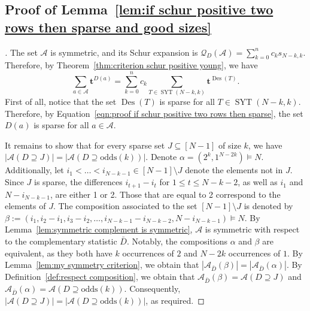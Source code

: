 \documentclass[11pt]{article}
\theoremstyle{definition}
\numberwithin{equation}{section}
\providecommand{\nopunct}{\spacefactor1007\relax}
\newcommand{\Des}{\operatorname{Des}}
\newcommand{\Syt}{\operatorname{SYT}}
\newcommand{\Q}{\mathcal{Q}}
\newcommand{\A}{\mathcal{A}}
\newcommand{\odds}{\mathrm{odds}}
\begin{document}
\subsection{Proof of Lemma~\ref{lem:if schur positive two rows then sparse and good sizes}}
\label{subsec:proof lemma if schur positive two rows then sparse and good sizes}
\begin{proof}[\unskip\nopunct]
    The set $\A$ is symmetric, and its Schur expansion is $\Q_{D}(\A) = \sum_{k=0}^n c_k s_{N-k,k}$. Therefore, by Theorem~\ref{thm:criterion schur positive young}, we have
    \begin{equation}\label{eqn:proof if schur positive two rows then sparse}
        \sum_{a \in \A} \boldsymbol{t}^{D(a)} = \sum_{k=0}^n c_k \sum_{T \in \Syt(N-k,k)} \boldsymbol{t}^{\Des(T)}.
    \end{equation}
    First of all, notice that the set $\Des(T)$ is sparse for all $T \in \Syt(N-k,k)$. Therefore, by Equation~\eqref{eqn:proof if schur positive two rows then sparse}, the set $D(a)$ is sparse for all $a \in \A$.
    
    It remains to show that for every sparse set $J \subseteq [N-1]$ of size $k$, we have $\left|\A(D \supseteq J)\right| = \left|\A(D \supseteq \odds(k))\right|$. Denote $\alpha = (2^k,1^{N-2k}) \vDash N$. Additionally, let $i_1 < \dots < i_{N-k-1} \in [N-1]\setminus J$ denote the elements not in $J$. Since $J$ is sparse, the differences $i_{t+1} - i_t$ for $1 \le t \le N-k-2$, as well as $i_1$ and $N - i_{N-k-1}$, are either 1 or 2. Those that are equal to 2 correspond to the elements of $J$. The composition associated to the set $[N-1]\setminus J$ is denoted by $\beta := (i_1, i_2 - i_1, i_3 -i_2, \dots, i_{N-k-1} - i_{N-k-2}, N-i_{N-k-1}) \vDash N$. By Lemma~\ref{lem:symmetric complement is symmetric}, $\A$ is symmetric with respect to the complementary statistic $\bar{D}$. Notably, the compositions $\alpha$ and $\beta$ are equivalent, as they both have $k$ occurrences of $2$ and $N-2k$ occurrences of $1$. By Lemma~\ref{lem:my symmetry criterion}, we obtain that $|\A_{\bar{D}}(\beta)| = |\A_{\bar{D}}(\alpha)|$. By Definition~\ref{def:respect composition}, we obtain that $\A_{\bar{D}}(\beta) = \A(D \supseteq J)$ and $\A_{\bar{D}}(\alpha) = \A(D \supseteq \odds(k))$. Consequently, $|\A(D \supseteq J)| = |\A(D \supseteq \odds(k))|$, as required.
\end{proof}
\end{document}
